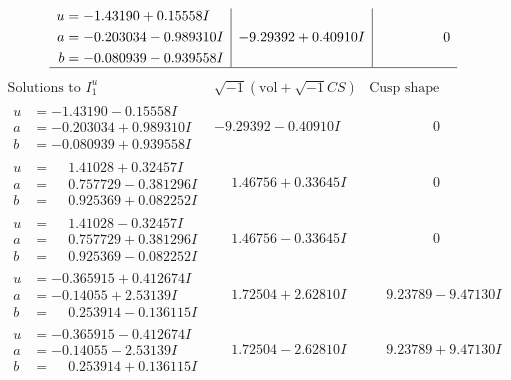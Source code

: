 \documentclass[1p]{elsarticle_modified}
\theoremstyle{definition}
\newcommand{\I}{\sqrt{-1}}
\begin{document}
$$\begin{array}{c|c|c}
\begin{aligned}
u &= -1.43190 + 0.15558 I \\
a &= -0.203034 - 0.989310 I \\
b &= -0.080939 - 0.939558 I\end{aligned}
 & -9.29392 + 0.40910 I & \phantom{-0.000000 } 0\\
 \hline 
 \end{array}$$\newpage$$\begin{array}{c|c|c}  
\text{Solutions to }I^u_{1}& \I (\text{vol} + \sqrt{-1}CS) & \text{Cusp shape}\\
 \hline 
\begin{aligned}
u &= -1.43190 - 0.15558 I \\
a &= -0.203034 + 0.989310 I \\
b &= -0.080939 + 0.939558 I\end{aligned}
 & -9.29392 - 0.40910 I & \phantom{-0.000000 } 0 \\ \hline\begin{aligned}
u &= \phantom{-}1.41028 + 0.32457 I \\
a &= \phantom{-}0.757729 - 0.381296 I \\
b &= \phantom{-}0.925369 + 0.082252 I\end{aligned}
 & \phantom{-}1.46756 + 0.33645 I & \phantom{-0.000000 } 0 \\ \hline\begin{aligned}
u &= \phantom{-}1.41028 - 0.32457 I \\
a &= \phantom{-}0.757729 + 0.381296 I \\
b &= \phantom{-}0.925369 - 0.082252 I\end{aligned}
 & \phantom{-}1.46756 - 0.33645 I & \phantom{-0.000000 } 0 \\ \hline\begin{aligned}
u &= -0.365915 + 0.412674 I \\
a &= -0.14055 + 2.53139 I \\
b &= \phantom{-}0.253914 - 0.136115 I\end{aligned}
 & \phantom{-}1.72504 + 2.62810 I & \phantom{-}9.23789 - 9.47130 I \\ \hline\begin{aligned}
u &= -0.365915 - 0.412674 I \\
a &= -0.14055 - 2.53139 I \\
b &= \phantom{-}0.253914 + 0.136115 I\end{aligned}
 & \phantom{-}1.72504 - 2.62810 I & \phantom{-}9.23789 + 9.47130 I \\ \hline\begin{aligned}

\end{aligned}
\end{array}$$
\end{document}
